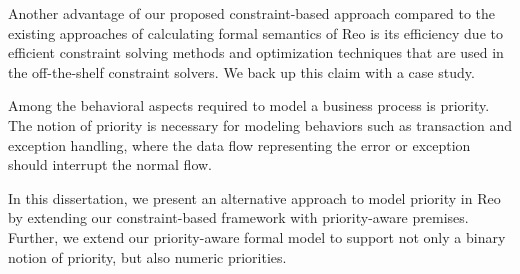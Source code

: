 Another advantage of our proposed constraint-based approach compared to the existing approaches of calculating formal semantics of Reo is its efficiency due to efficient constraint solving methods and optimization techniques that are used in the off-the-shelf constraint solvers. We back up this claim with a case study.

Among the behavioral aspects required to model a business process is {priority}. The notion of priority is necessary for modeling behaviors such as transaction and exception handling, where the data flow representing the error or exception should interrupt the normal flow. 

In this dissertation, we present an alternative approach to model priority in Reo by extending our constraint-based framework with priority-aware premises. Further, we extend our priority-aware formal model to support not only a binary notion of priority, but also numeric priorities. 

